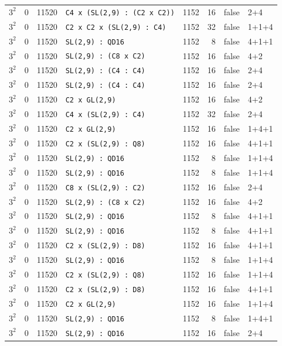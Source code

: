 \begin{longtable}{llrlrrll}
$3^2$ & 0 & 11520 & \texttt{C4 x (SL(2,9) : (C2 x C2))} & 1152 & 16 & false & 2+4\\
$3^2$ & 0 & 11520 & \texttt{C2 x C2 x (SL(2,9) : C4)} & 1152 & 32 & false & 1+1+4\\
$3^2$ & 0 & 11520 & \texttt{SL(2,9) : QD16} & 1152 & 8 & false & 4+1+1\\
$3^2$ & 0 & 11520 & \texttt{SL(2,9) : (C8 x C2)} & 1152 & 16 & false & 4+2\\
$3^2$ & 0 & 11520 & \texttt{SL(2,9) : (C4 : C4)} & 1152 & 16 & false & 2+4\\
$3^2$ & 0 & 11520 & \texttt{SL(2,9) : (C4 : C4)} & 1152 & 16 & false & 2+4\\
$3^2$ & 0 & 11520 & \texttt{C2 x GL(2,9)} & 1152 & 16 & false & 4+2\\
$3^2$ & 0 & 11520 & \texttt{C4 x (SL(2,9) : C4)} & 1152 & 32 & false & 2+4\\
$3^2$ & 0 & 11520 & \texttt{C2 x GL(2,9)} & 1152 & 16 & false & 1+4+1\\
$3^2$ & 0 & 11520 & \texttt{C2 x (SL(2,9) : Q8)} & 1152 & 16 & false & 4+1+1\\
$3^2$ & 0 & 11520 & \texttt{SL(2,9) : QD16} & 1152 & 8 & false & 1+1+4\\
$3^2$ & 0 & 11520 & \texttt{SL(2,9) : QD16} & 1152 & 8 & false & 1+1+4\\
$3^2$ & 0 & 11520 & \texttt{C8 x (SL(2,9) : C2)} & 1152 & 16 & false & 2+4\\
$3^2$ & 0 & 11520 & \texttt{SL(2,9) : (C8 x C2)} & 1152 & 16 & false & 4+2\\
$3^2$ & 0 & 11520 & \texttt{SL(2,9) : QD16} & 1152 & 8 & false & 4+1+1\\
$3^2$ & 0 & 11520 & \texttt{SL(2,9) : QD16} & 1152 & 8 & false & 4+1+1\\
$3^2$ & 0 & 11520 & \texttt{C2 x (SL(2,9) : D8)} & 1152 & 16 & false & 4+1+1\\
$3^2$ & 0 & 11520 & \texttt{SL(2,9) : QD16} & 1152 & 8 & false & 1+1+4\\
$3^2$ & 0 & 11520 & \texttt{C2 x (SL(2,9) : Q8)} & 1152 & 16 & false & 1+1+4\\
$3^2$ & 0 & 11520 & \texttt{C2 x (SL(2,9) : D8)} & 1152 & 16 & false & 4+1+1\\
$3^2$ & 0 & 11520 & \texttt{C2 x GL(2,9)} & 1152 & 16 & false & 1+1+4\\
$3^2$ & 0 & 11520 & \texttt{SL(2,9) : QD16} & 1152 & 8 & false & 1+4+1\\
$3^2$ & 0 & 11520 & \texttt{SL(2,9) : QD16} & 1152 & 16 & false & 2+4\\

\end{longtable}
